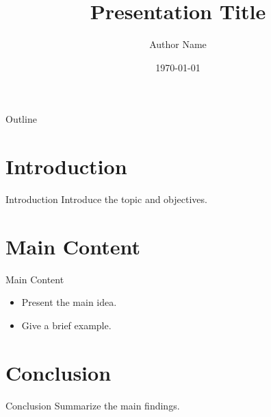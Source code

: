 \documentclass[aspectratio=169,11pt]{beamer}
\title{Presentation Title}
\author{Author Name}
\institute{Institution or Affiliation}
\date{\today}
\begin{document}
\begin{frame}
  \maketitle
\end{frame}

\begin{frame}{Outline}
  \tableofcontents
\end{frame}

\section{Introduction}
\begin{frame}{Introduction}
  Introduce the topic and objectives.
\end{frame}

\section{Main Content}
\begin{frame}{Main Content}
  \begin{itemize}
    \item Present the main idea.
    \item Give a brief example.
  \end{itemize}
\end{frame}

\section{Conclusion}
\begin{frame}{Conclusion}
  Summarize the main findings.
\end{frame}
\end{document}
